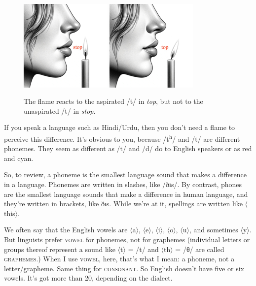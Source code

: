 \begin{figure}
    \centering
    \includegraphics[width=0.4\textwidth]{figures/stop.jpg}
    \includegraphics[width=0.4\textwidth]{figures/top.jpg}
    \caption{The flame reacts to the aspirated /t/ in \textit{top}, but not to the unaspirated /t/ in \textit{stop}.}
    \label{fig:top-stop-flame}
\end{figure}

If you speak a language such as Hindi/Urdu, then you don't need a flame to perceive this difference. It's obvious to you, because /t\textsuperscript{h}/ and /t/ are different phonemes. They seem as different as /t/ and /d/ do to English speakers or as red and cyan.

So, to review, a phoneme is the smallest language sound that makes a difference in a  language. Phonemes are written in slashes, like /ðɪs/. By contrast, phones are the smallest language sounds that make a difference in human language, and they're written in brackets, like \ob ðɪs{\cb}. While we're at it, spellings are written like $\langle$this$\rangle$.


\begin{tcolorbox}[title=Vowels and consonants] \label{sec:vowels-and-consonants}
    We often say that the English vowels are $\langle$a$\rangle$, $\langle$e$\rangle$, $\langle$i$\rangle$, $\langle$o$\rangle$, $\langle$u$\rangle$, and sometimes $\langle$y$\rangle$. But linguists prefer \textsc{vowel} for phonemes, not for graphemes (individual letters or groups thereof represent a sound like $\langle$t$\rangle$ = /t/ and $\langle$th$\rangle$ = /θ/ are called \textsc{graphemes}.) When I use \textsc{vowel}, here, that's what I mean: a phoneme, not a letter/grapheme. Same thing for \textsc{consonant}. So English doesn't have five or six vowels. It's got more than 20, depending on the dialect.
\end{tcolorbox}

